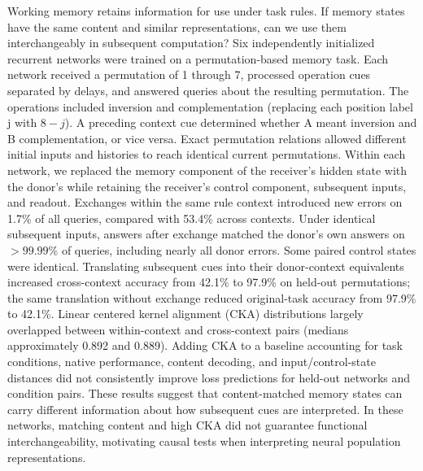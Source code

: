 Working memory retains information for use under task rules. If memory states have the same content and similar representations, can we use them interchangeably in subsequent computation? Six independently initialized recurrent networks were trained on a permutation-based memory task. Each network received a permutation of 1 through 7, processed operation cues separated by delays, and answered queries about the resulting permutation. The operations included inversion and complementation (replacing each position label j with $8-j$). A preceding context cue determined whether A meant inversion and B complementation, or vice versa. Exact permutation relations allowed different initial inputs and histories to reach identical current permutations. Within each network, we replaced the memory component of the receiver's hidden state with the donor's while retaining the receiver's control component, subsequent inputs, and readout. Exchanges within the same rule context introduced new errors on 1.7\% of all queries, compared with 53.4\% across contexts. Under identical subsequent inputs, answers after exchange matched the donor's own answers on $>99.99$\% of queries, including nearly all donor errors. Some paired control states were identical. Translating subsequent cues into their donor-context equivalents increased cross-context accuracy from 42.1\% to 97.9\% on held-out permutations; the same translation without exchange reduced original-task accuracy from 97.9\% to 42.1\%. Linear centered kernel alignment (CKA) distributions largely overlapped between within-context and cross-context pairs (medians approximately 0.892 and 0.889). Adding CKA to a baseline accounting for task conditions, native performance, content decoding, and input/control-state distances did not consistently improve loss predictions for held-out networks and condition pairs. These results suggest that content-matched memory states can carry different information about how subsequent cues are interpreted. In these networks, matching content and high CKA did not guarantee functional interchangeability, motivating causal tests when interpreting neural population representations.
